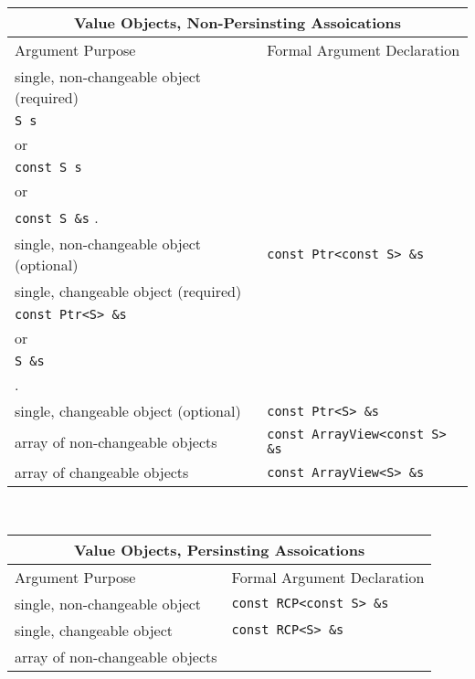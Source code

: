 \begin{table}[p]
%
\begin{center}
%
%
\begin{tabular}{|l|l|}
%
\multicolumn{2}{c}{\textbf{Value Objects, Non-Persinsting Assoications}} \\
%
\hline
Argument Purpose
& Formal Argument Declaration \\
\hline
\hline
single, non-changeable object (required)
& \begin{minipage}{12ex}
    {\tiny .}\\
    {}\texttt{S s} \\
    or \\
    {}\texttt{const S s} \\
    or \\
    {}\texttt{const S \&s}
    {\tiny .}
  \end{minipage} \\
\hline
single, non-changeable object (optional)
& {}\texttt{const Ptr<const S> \&s} \\
\hline
single, changeable object (required)
& \begin{minipage}{20ex}
    {\tiny .}\\
    {}\texttt{const Ptr<S> \&s} \\
    or \\
    {}\texttt{S \&s} \\
    {\tiny .}
  \end{minipage} \\
\hline
single, changeable object (optional)
& \texttt{const Ptr<S> \&s} \\
\hline
array of non-changeable objects
& {}\texttt{const ArrayView<const S> \&s} \\
\hline
array of changeable objects
& {}\texttt{const ArrayView<S> \&s} \\
\hline
%
\end{tabular} \\[3ex]
%
\begin{tabular}{|l|l|}
%
\multicolumn{2}{c}{\textbf{Value Objects, Persinsting Assoications}} \\
%
\hline
Argument Purpose
& Formal Argument Declaration \\
\hline
\hline
single, non-changeable object
& {}\texttt{const RCP<const S> \&s} \\
\hline
single, changeable object
& {}\texttt{const RCP<S> \&s} \\
\hline
array of non-changeable objects

\end{tabular}
\end{center}
\end{table}
